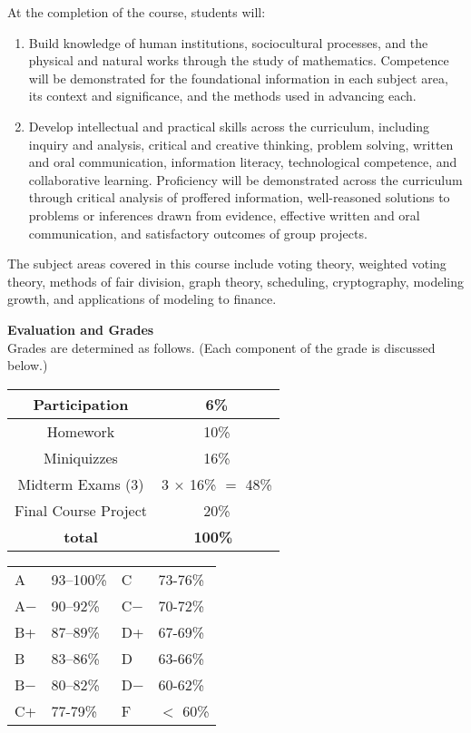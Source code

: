 \documentclass[11pt]{article}
\renewcommand{\emph}[1]{\textsf{\textbf{#1}}}
\newcommand{\localhead}[1]{\par\smallskip\textbf{#1} \smallskip\nobreak\\}%
\def\heading#1{\localhead{\large\emph{#1}}}
\begin{document}
 At the completion of the course, students will:
 \begin{enumerate}
 \item Build knowledge of human institutions, sociocultural processes, and the physical and
   natural works through the study of mathematics. Competence will be demonstrated for
   the foundational information in each subject area, its context and significance, and the
   methods used in advancing each.
 \item Develop intellectual and practical skills across the curriculum, including inquiry and
   analysis, critical and creative thinking, problem solving, written and oral communication,
   information literacy, technological competence, and collaborative learning. Proficiency
   will be demonstrated across the curriculum through critical analysis of proffered
   information, well-reasoned solutions to problems or inferences drawn from evidence,
   effective written and oral communication, and satisfactory outcomes of group projects.
 \end{enumerate}

The subject areas covered in this course include voting theory, weighted voting theory, methods of fair division, graph theory, scheduling, cryptography, modeling growth, and applications of modeling to finance.

\strut


\heading{Evaluation and Grades}
Grades are determined as follows.  (Each component of the grade is discussed below.)
 
\begin{multicols}{2}
\begin{tabular}{|c|c|}
\hline
Participation & 6\%\\
\hline
Homework & 10\% \\
\hline
Miniquizzes & 16\% \\
\hline
Midterm Exams (3) & 3 $\times$ 16\% $=$ 48\% \\
\hline
Final Course Project & 20\% \\
\hline
{\bf total} & {\bf 100\%} \, \\
\hline
\end{tabular}
%
\hspace{1cm}
\begin{tabular}{llll}
A  & 93--100\%& C  & 73-76\%  \\
A$-$ & 90--92\% & C$-$ & 70-72\% \\
B+ & 87--89\% & D+ & 67-69\%  \\
B  & 83--86\% & D  & 63-66\%  \\
B$-$& 80--82\% & D$-$ & 60-62\%  \\
C+ & 77-79\% & F  & $<$ 60\%
\end{tabular}
\end{multicols}
\end{document}
